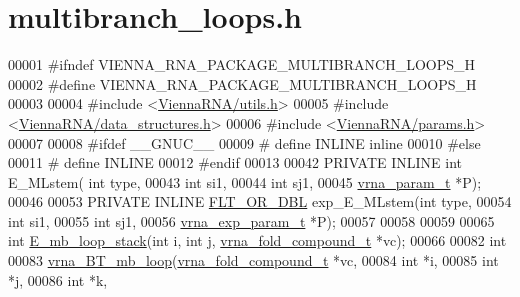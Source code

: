 \hypertarget{multibranch__loops_8h_source}{\section{multibranch\+\_\+loops.\+h}
\label{multibranch__loops_8h_source}
}

\begin{DoxyCode}
00001 \textcolor{preprocessor}{#ifndef VIENNA\_RNA\_PACKAGE\_MULTIBRANCH\_LOOPS\_H}
00002 \textcolor{preprocessor}{#define VIENNA\_RNA\_PACKAGE\_MULTIBRANCH\_LOOPS\_H}
00003 
00004 \textcolor{preprocessor}{#include <\hyperlink{utils_8h}{ViennaRNA/utils.h}>}
00005 \textcolor{preprocessor}{#include <\hyperlink{data__structures_8h}{ViennaRNA/data\_structures.h}>}
00006 \textcolor{preprocessor}{#include <\hyperlink{params_8h}{ViennaRNA/params.h}>}
00007 
00008 \textcolor{preprocessor}{#ifdef \_\_GNUC\_\_}
00009 \textcolor{preprocessor}{# define INLINE inline}
00010 \textcolor{preprocessor}{#else}
00011 \textcolor{preprocessor}{# define INLINE}
00012 \textcolor{preprocessor}{#endif}
00013 
00042 PRIVATE INLINE \textcolor{keywordtype}{int} E\_MLstem( \textcolor{keywordtype}{int} type,
00043                               \textcolor{keywordtype}{int} si1,
00044                               \textcolor{keywordtype}{int} sj1,
00045                               \hyperlink{group__energy__parameters_structvrna__param__s}{vrna\_param\_t} *P);
00046 
00053 PRIVATE INLINE \hyperlink{group__data__structures_ga31125aeace516926bf7f251f759b6126}{FLT\_OR\_DBL} exp\_E\_MLstem(\textcolor{keywordtype}{int} type,
00054                                     \textcolor{keywordtype}{int} si1,
00055                                     \textcolor{keywordtype}{int} sj1,
00056                                     \hyperlink{group__energy__parameters_structvrna__exp__param__s}{vrna\_exp\_param\_t} *P);
00057 
00058 
00059 
00065 \textcolor{keywordtype}{int} \hyperlink{group__loops_ga81d73d23f480f84df8cfd0042c032503}{E\_mb\_loop\_stack}(\textcolor{keywordtype}{int} i, \textcolor{keywordtype}{int} j, \hyperlink{group__fold__compound_structvrna__fc__s}{vrna\_fold\_compound\_t} *vc);
00066 
00082 \textcolor{keywordtype}{int}
00083 \hyperlink{group__loops_ga9cb520ddfd8b3a48089a7910b045d06b}{vrna\_BT\_mb\_loop}(\hyperlink{group__fold__compound_structvrna__fc__s}{vrna\_fold\_compound\_t} *vc,
00084                 \textcolor{keywordtype}{int} *i,
00085                 \textcolor{keywordtype}{int} *j,
00086                 \textcolor{keywordtype}{int} *k,

\end{DoxyCode}
